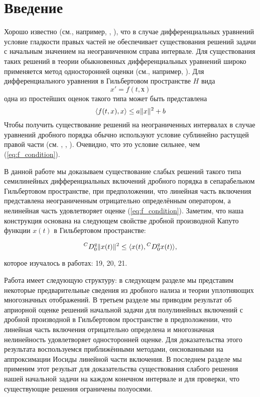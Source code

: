 \section{Введение}

Хорошо известно (см., например, \cite{coddington}, \cite{krasnoselskii}), что в случае
дифференциальных уравнений условие гладкости правых частей не обеспечивает существования решений задачи с
начальным значением на неограниченном справа интервале. Для существования таких решений в теории обыкновенных
дифференциальных уравнений широко применяется метод односторонней оценки (см., например, \cite{coddington}).
Для дифференциального уравнения в Гильбертовом пространстве $H$ вида
\begin{equation*}
    x' = f(t,х)
\end{equation*}
\noindent одна из простейших оценок такого типа может быть представлена
\begin{equation}
    \label{eq:f_condition}
    \langle f(t,x),x\rangle \leq a \lVert x\rVert^{2} + b
\end{equation}
\noindent Чтобы получить существование решений на неограниченных интервалах в случае уравнений дробного порядка
обычно используют условие сублинейно растущей правой части (см. \cite{kamenskii_aa}, \cite{kamenskii_fpta19},
\cite{kamenskii_m}). Очевидно, что это условие сильнее,
чем (\ref{eq:f_condition}).

В данной работе мы доказываем существование слабых решений такого типа семилинейных дифференциальных включений дробного
порядка в сепарабельном Гильбертовом пространстве, при предположении, что линейная часть включения представлена неограниченным
отрицательно определённым оператором, а нелинейная часть удовлетворяет оценке (\ref{eq:f_condition}). Заметим, что
наша конструкция основана на следующем свойстве дробной производной Капуто функции $x(t)$ в Гильбертовом пространстве:

\begin{equation*}
    {}^{C} D_{0}^{q} \lVert x(t)\rVert^{2} \leq \langle x(t), {}^{C} D_{0}^{q} x(t) \rangle,
\end{equation*}

\noindent которое изучалось в работах: 19, 20, 21.

Работа имеет следующую структуру: в следующем разделе мы представим некоторые предварительные сведения из
дробного нализа и теории уплотняющих многозначных отображений. В третьем разделе мы приводим результат об априорной оценке
решений начальной задачи для полулинейных включений с дробной производной в Гильбертовом пространстве в предположении,
что линейная часть включения отрицательно определена и многозначная нелинейность удовлетворяет односторонней оценке.
Для доказательства этого результата воспользуемся приближёнными методами, онснованными на аппроксимации
Иосиды линейной части включения. В последнем разделе мы применим этот резульат для доказательства существования
слабого решения нашей начальной задачи на каждом конечном интервале и для проверки, что существующие решения ограничены
полуосями.

